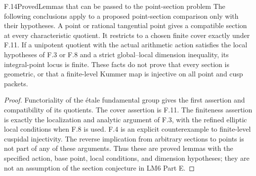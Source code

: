 \begin{statement}{F.14}{Proved}{Lemmas that can be passed to the point-section problem}
The following conclusions apply to a proposed
point-section comparison only with their hypotheses.
A point or rational tangential point gives a
compatible section at every characteristic quotient.
It restricts to a chosen finite cover exactly under
F.11. If a unipotent quotient with the actual
arithmetic action satisfies the local hypotheses
of F.3 or F.8 and a strict global--local dimension
inequality, its integral-point locus is finite.
These facts do not prove that every section is
geometric, or that a finite-level Kummer map is
injective on all point and cusp packets.
\end{statement}
\begin{proof}
Functoriality of the étale fundamental group gives
the first assertion and compatibility of its
quotients. The cover assertion is F.11.
The finiteness assertion is exactly the localization
and analytic argument of F.3, with the refined
elliptic local conditions when F.8 is used. F.4
is an explicit counterexample to finite-level
cuspidal injectivity. The reverse implication
from arbitrary sections to points is not part
of any of these arguments. Thus these are
proved lemmas with the specified action,
base point, local conditions, and dimension
hypotheses; they are not an assumption of
the section conjecture in LM6 Part E.
\end{proof}


